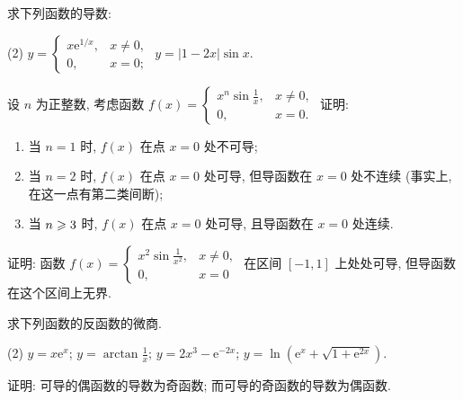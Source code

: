 \begin{exercise}[3.1.11]
    求下列函数的导数:
    \begin{tasks}[label=(\arabic*)](2)
        \task $y = \begin{cases} x\mathrm{e}^{1/x}, & x \ne 0, \\ 0, & x=0; \end{cases}$
        \task $y = |1-2x|\sin x$.
    \end{tasks}
\end{exercise}

\begin{exercise}[3.1.12]
    设 $n$ 为正整数, 考虑函数 $f(x) = \begin{cases} x^n \sin\frac{1}{x}, & x \ne 0, \\ 0, & x=0. \end{cases}$ 证明:
    \begin{enumerate}
        \item 当 $n=1$ 时, $f(x)$ 在点 $x=0$ 处不可导;
        \item 当 $n=2$ 时, $f(x)$ 在点 $x=0$ 处可导, 但导函数在 $x=0$ 处不连续 (事实上, 在这一点有第二类间断);
        \item 当 $n \geqslant 3$ 时, $f(x)$ 在点 $x=0$ 处可导, 且导函数在 $x=0$ 处连续.
    \end{enumerate}
\end{exercise}

\begin{exercise}[3.1.13]
    证明: 函数 $f(x) = \begin{cases} x^2\sin\frac{1}{x^2}, & x \ne 0, \\ 0, & x=0 \end{cases}$ 在区间 $[-1,1]$ 上处处可导, 但导函数在这个区间上无界.
\end{exercise}

\begin{exercise}[3.1.14]
    求下列函数的反函数的微商.
    \begin{tasks}[label=(\arabic*)](2)
        \task $y = x\mathrm{e}^x$;
        \task $y = \arctan\frac{1}{x}$;
        \task $y = 2x^3 - \mathrm{e}^{-2x}$;
        \task $y = \ln(\mathrm{e}^x+\sqrt{1+\mathrm{e}^{2x}})$.
    \end{tasks}
\end{exercise}

\begin{exercise}[3.1.15]
    证明: 可导的偶函数的导数为奇函数; 而可导的奇函数的导数为偶函数.
\end{exercise}


